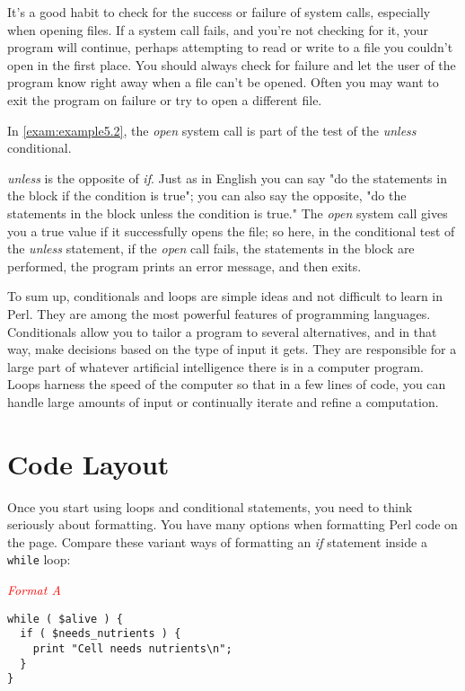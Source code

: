 It's a good habit to check for the success or failure of system calls, especially when opening files. If a system call fails, and you're not checking for it, your program will continue, perhaps attempting to read or write to a file you couldn't open in the first place. You should always check for failure and let the user of the program know right away when a file can't be opened. Often you may want to exit the program on failure or try to open a different file.  

In \autoref{exam:example5.2}, the \textit{open} system call is part of the test of the \textit{unless} conditional.

\textit{unless} is the opposite of \textit{if}. Just as in English you can say "do the statements in the block if the condition is true"; you can also say the opposite, "do the statements in the block unless the condition is true." The \textit{open} system call gives you a true value if it successfully opens the file; so here, in the conditional test of the \textit{unless} statement, if the \textit{open} call fails, the statements in the block are performed, the program prints an error message, and then exits.

To sum up, conditionals and loops are simple ideas and not difficult to learn in Perl. They are among the most powerful features of programming languages. Conditionals allow you to tailor a program to several alternatives, and in that way, make decisions based on the type of input it gets. They are responsible for a large part of whatever artificial intelligence there is in a computer program. Loops harness the speed of the computer so that in a few lines of code, you can handle large amounts of input or continually iterate and refine a computation. 

\section{Code Layout}
\label{sect:section5.2}
Once you start using loops and conditional statements, you need to think seriously about formatting. You have many options when formatting Perl code on the page. Compare these variant ways of formatting an \textit{if} statement inside a \verb|while| loop:

\textcolor{red}{\textit{Format A}}
\begin{adjustwidth}{1cm}{}
\begin{lstlisting}
while ( $alive ) {
  if ( $needs_nutrients ) {
    print "Cell needs nutrients\n";
  }
}
\end{lstlisting}
\end{adjustwidth}

